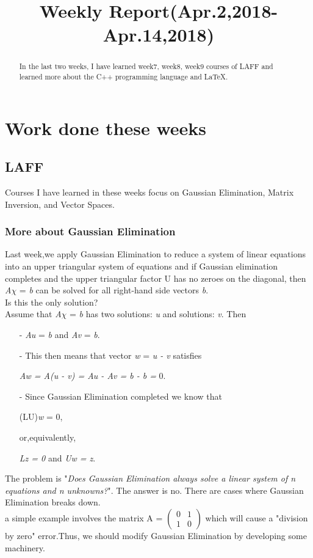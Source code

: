 \documentclass{article}
\title{Weekly Report(Apr.2,2018-Apr.14,2018)}
\begin{document}
\maketitle

\begin{abstract}
In the last two weeks, I have learned week7, week8, week9 courses of LAFF and learned more about the C++ programming language and \LaTeX.
\end{abstract}

\section{Work done these weeks}

\subsection{LAFF}
Courses I have learned in these weeks focus on Gaussian Elimination, Matrix Inversion, and Vector Spaces.

\subsubsection{More about Gaussian Elimination}
Last week,we apply Gaussian Elimination to reduce a system of linear equations into an upper triangular system of equations and if Gaussian elimination completes and the upper triangular factor U has no zeroes on the diagonal, then \emph{A$\chi$} = \emph{b} can be solved for all right-hand side vectors \emph{b}.\\
Is this the only solution?\\
Assume that \emph{A$\chi$} = \emph{b} has two solutions: \emph{u} and solutions: \emph{v}. Then\\
\begin{itemize}
\item[-]\emph{Au} = \emph{b} and \emph{Av} = \emph{b}.
\item[-]This then means that vector \emph{w} = \emph{u - v} satisfies
\begin{center}
\emph{Aw = A(u - v) = Au - Av = b - b = }0.
\end{center}
\item[-]Since Gaussian Elimination completed we know that
\begin{center}
(LU)\emph{w} = 0,
\end{center}
or,equivalently,
\begin{center}
\emph{Lz = 0} and \emph{Uw = z}.
\end{center}
\end{itemize}
The problem is "\emph{Does Gaussian Elimination always solve a linear system of n equations and n unknowns?}". The answer is no. There are cases where Gaussian Elimination breaks down.\\
a simple example involves the matrix A = 
\(
\begin{pmatrix}
    0 & 1\\
    1 & 0  
\end{pmatrix}
\) which will cause a "division by zero" error.Thus, we should modify Gaussian Elimination by developing some machinery.
\end{document}
